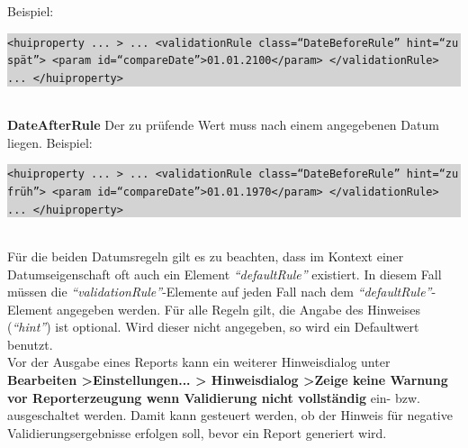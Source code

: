 \documentclass[a4paper,10pt]{book}
\begin{document}
\newline
Beispiel:
\newline\\
\colorbox{lightgray}{\parbox{\textwidth}{
{\tt <huiproperty ... >\newline
   ...\newline
   <validationRule class=``DateBeforeRule'' hint=``zu spät''>\newline
      <param id=``compareDate''>01.01.2100</param>\newline
   </validationRule>\newline
   ...\newline
</huiproperty>}
}}
\newline\\
\textbf{DateAfterRule}
\newline
Der zu prüfende Wert muss nach einem angegebenen Datum liegen.
\newline
Beispiel:
\newline\\
\colorbox{lightgray}{\parbox{\textwidth}{
{\tt <huiproperty ... >\newline
   ...\newline
   <validationRule class=``DateBeforeRule'' hint=``zu früh''>\newline
      <param id=``compareDate''>01.01.1970</param>\newline
   </validationRule>\newline
   ...\newline
</huiproperty>}
}}
\newline\\
Für die beiden Datumsregeln gilt es zu beachten, dass im Kontext einer Datumseigenschaft oft auch ein Element
\textit{``defaultRule''} existiert. In diesem Fall müssen die \textit{``validationRule''}-Elemente auf jeden Fall
nach dem \textit{``defaultRule''}-Element angegeben werden.
\newline
Für alle Regeln gilt, die Angabe des Hinweises (\textit{``hint''}) ist optional. Wird dieser nicht angegeben, so wird ein Defaultwert benutzt.
\newline\\
Vor der Ausgabe eines Reports kann ein weiterer Hinweisdialog unter \textbf{Bearbeiten \textgreater Einstellungen... \textgreater
Hinweisdialog \textgreater Zeige keine Warnung vor Reporterzeugung wenn Validierung nicht vollständig} ein- bzw. ausgeschaltet werden.
Damit kann gesteuert werden, ob der Hinweis für negative Validierungsergebnisse erfolgen soll, bevor ein Report generiert wird.
\end{document}
